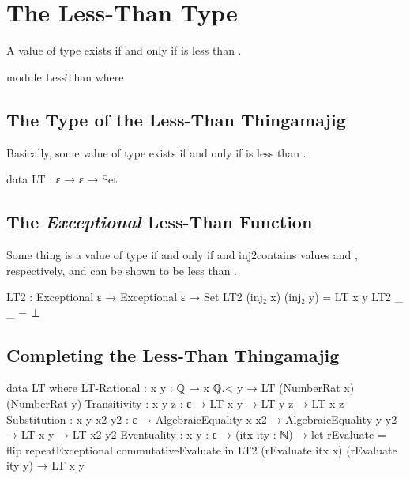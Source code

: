 \documentclass{report}
\begin{document}
\chapter{The Less-Than Type}
A value of type    exists if and only if  is less than .

\begin{code}
  module LessThan where
\end{code}

\section{The Type of the Less-Than Thingamajig}
Basically, some value of type    exists if and only if  is less than .

\begin{code}
    data LT : ε → ε → Set
\end{code}

\section{The \emph{Exceptional} Less-Than Function}
Some thing is a value of type    if and only if  and  \glspl{inj2contain} values  and , respectively, and  can be shown to be less than .

\begin{code}
    LT2 : Exceptional ε → Exceptional ε → Set
    LT2 (inj₂ x) (inj₂ y) = LT x y
    LT2 _ _ = ⊥
\end{code}

\section{Completing the Less-Than Thingamajig}

\begin{code}
    data LT where
      LT-Rational :
        {x y : ℚ} → x ℚ.< y → LT (NumberRat x) (NumberRat y)
      Transitivity : {x y z : ε} → LT x y → LT y z → LT x z
      Substitution : {x y x2 y2 : ε} →
                     AlgebraicEquality x x2 →
                     AlgebraicEquality y y2 →
                     LT x y → LT x2 y2
      Eventuality :
        {x y : ε} →
        (itx ity : ℕ) →
        let rEvaluate = flip repeatExceptional commutativeEvaluate in
        LT2 (rEvaluate itx x) (rEvaluate ity y) →
        LT x y
\end{code}
\end{document}
